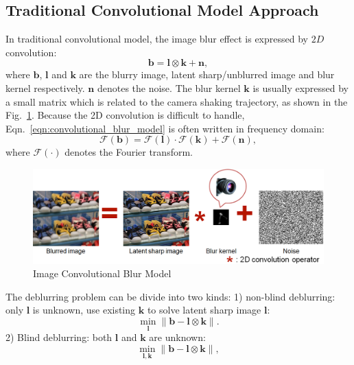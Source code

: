 \documentclass[journal, onecolumn, 10pt]{IEEEtran}
\begin{document}
\subsection{Traditional Convolutional Model Approach}
In traditional convolutional model, the image blur effect is expressed by $2D$ convolution:
\begin{equation}
\mathbf{b} = \mathbf{l} \otimes \mathbf{k} + \mathbf{n},
\label{eqn:convolutional_blur_model}
\end{equation}
where $\mathbf{b}$, $\mathbf{l}$ and $\mathbf{k}$ are the blurry image, latent sharp/unblurred image and blur kernel respectively. $\mathbf{n}$ denotes the noise. The blur kernel $\mathbf{k}$ is usually expressed by a small matrix which is related to the camera shaking trajectory, as shown in the Fig.~\ref{fig:convolutional_blur_model}. Because the 2D convolution is difficult to handle, Eqn.~\ref{eqn:convolutional_blur_model} is often written in frequency domain:
\begin{equation}
\mathcal{F}(\mathbf{b}) = \mathcal{F}(\mathbf{l}) \cdot \mathcal{F}(\mathbf{k}) + \mathcal{F}(\mathbf{n}),
\label{eqn:convolutional_blur_model_frequency}
\end{equation}
where $\mathcal{F}(\cdot)$ denotes the Fourier transform.
\begin{figure}[h!]
\centering
\includegraphics[width = 1\textwidth]{pic/convolutional_model.png}
\caption{Image Convolutional Blur Model}
\label{fig:convolutional_blur_model}
\end{figure}

The deblurring problem can be divide into two kinds: 1) non-blind deblurring: only $\mathbf{l}$ is unknown, use existing $\mathbf{k}$ to solve latent sharp image $\mathbf{l}$:
\begin{equation}
\min_{\mathbf{l}} \| \mathbf{b} - \mathbf{l} \otimes \mathbf{k} \|.
\label{eqn:non_blind_origin}
\end{equation}
2) Blind deblurring: both $\mathbf{l}$ and $\mathbf{k}$ are unknown:
\begin{equation}
\min_{\mathbf{l}, \mathbf{k}} \| \mathbf{b} - \mathbf{l} \otimes \mathbf{k} \|,
\label{eqn:blind_origin}
\end{equation}
\end{document}
